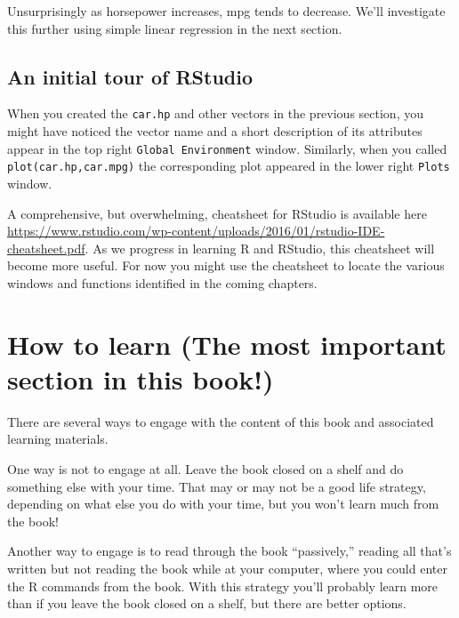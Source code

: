 Unsurprisingly as horsepower increases, mpg tends to decrease. We'll investigate this further using simple linear regression in the next section.

\subsection{An initial tour of RStudio}

When you created the \verb+car.hp+ and other vectors in the previous section, you might have noticed the vector name and a short description of its attributes appear in the top right \verb+Global Environment+ window. Similarly, when you called \verb+plot(car.hp,car.mpg)+ the corresponding plot appeared in the lower right \verb+Plots+ window.  

A comprehensive, but overwhelming, cheatsheet for RStudio is available here \url{https://www.rstudio.com/wp-content/uploads/2016/01/rstudio-IDE-cheatsheet.pdf}. As we progress in learning R and RStudio, this cheatsheet will become more useful. For now you might use the cheatsheet to locate the various windows and functions identified in the coming chapters.


\section{How to learn (The most important section in this book!)}
There are several ways to engage with the content of this book and associated learning materials. 

One way is not to engage at all. Leave the book closed on a shelf and do something else with your time. That may or may not be a good life strategy, depending on what else you do with your time, but you won't learn much from the book!

Another way to engage is to read through the book ``passively,'' reading all that's written but not reading the book while at your computer, where you could enter the R commands from the book. With this strategy you'll probably learn more than if you leave the book closed on a shelf, but there are better options.

